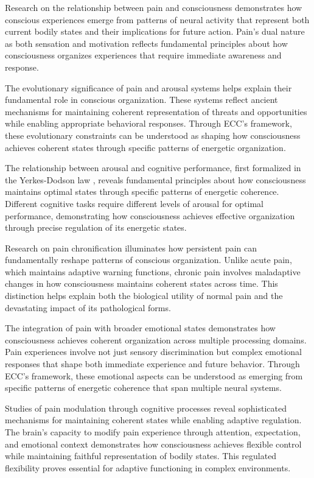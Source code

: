 Research on the relationship between pain and consciousness \cite{Damasio2013} demonstrates how conscious experiences emerge from patterns of neural activity that represent both current bodily states and their implications for future action. Pain's dual nature as both sensation and motivation reflects fundamental principles about how consciousness organizes experiences that require immediate awareness and response.

The evolutionary significance of pain and arousal systems \cite{Melzack1965} helps explain their fundamental role in conscious organization. These systems reflect ancient mechanisms for maintaining coherent representation of threats and opportunities while enabling appropriate behavioral responses. Through ECC's framework, these evolutionary constraints can be understood as shaping how consciousness achieves coherent states through specific patterns of energetic organization.

The relationship between arousal and cognitive performance, first formalized in the Yerkes-Dodson law \cite{Yerkes1908}, reveals fundamental principles about how consciousness maintains optimal states through specific patterns of energetic coherence. Different cognitive tasks require different levels of arousal for optimal performance, demonstrating how consciousness achieves effective organization through precise regulation of its energetic states.

Research on pain chronification \cite{Tracey2007} illuminates how persistent pain can fundamentally reshape patterns of conscious organization. Unlike acute pain, which maintains adaptive warning functions, chronic pain involves maladaptive changes in how consciousness maintains coherent states across time. This distinction helps explain both the biological utility of normal pain and the devastating impact of its pathological forms.

The integration of pain with broader emotional states \cite{Price2000} demonstrates how consciousness achieves coherent organization across multiple processing domains. Pain experiences involve not just sensory discrimination but complex emotional responses that shape both immediate experience and future behavior. Through ECC's framework, these emotional aspects can be understood as emerging from specific patterns of energetic coherence that span multiple neural systems.

Studies of pain modulation through cognitive processes \cite{Wiech2008} reveal sophisticated mechanisms for maintaining coherent states while enabling adaptive regulation. The brain's capacity to modify pain experience through attention, expectation, and emotional context demonstrates how consciousness achieves flexible control while maintaining faithful representation of bodily states. This regulated flexibility proves essential for adaptive functioning in complex environments.

